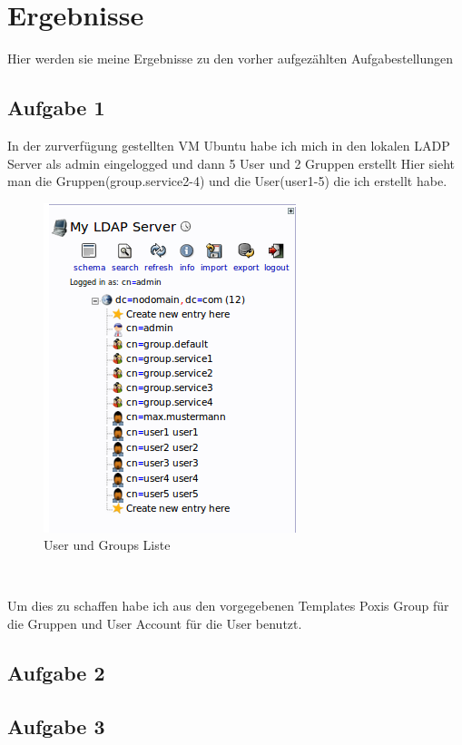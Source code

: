 
\section{Ergebnisse}
\label{sec:Ergebnisse}

Hier werden sie meine Ergebnisse zu den vorher aufgezählten Aufgabestellungen



\subsection{Aufgabe 1}
In der zurverfügung gestellten VM Ubuntu habe ich mich in den lokalen LADP Server als admin eingelogged und dann 5 User und 2 Gruppen erstellt
Hier sieht man die Gruppen(group.service2-4) und die User(user1-5) die ich erstellt habe.

\begin{figure}[!h]
	\begin{center}
		\includegraphics[width=0.3\linewidth]{images/aufgabe_1.png}
		\caption{User und Groups Liste \cite{tanenbaum2007verteilte}}
		\label{broker}
	\end{center}
\end{figure}​

Um dies zu schaffen habe ich aus den vorgegebenen Templates Poxis Group für die Gruppen und User Account für die User benutzt.

\clearpage
\subsection{Aufgabe 2}
\clearpage

\subsection{Aufgabe 3}
